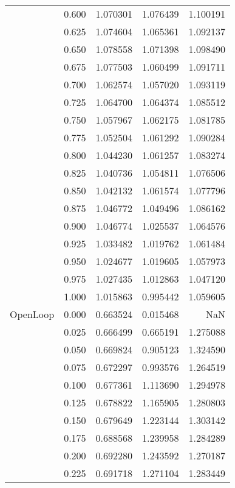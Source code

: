 \begin{tabular}{llrrr}
         & 0.600 &   1.070301 &   1.076439 &   1.100191 \\
         & 0.625 &   1.074604 &   1.065361 &   1.092137 \\
         & 0.650 &   1.078558 &   1.071398 &   1.098490 \\
         & 0.675 &   1.077503 &   1.060499 &   1.091711 \\
         & 0.700 &   1.062574 &   1.057020 &   1.093119 \\
         & 0.725 &   1.064700 &   1.064374 &   1.085512 \\
         & 0.750 &   1.057967 &   1.062175 &   1.081785 \\
         & 0.775 &   1.052504 &   1.061292 &   1.090284 \\
         & 0.800 &   1.044230 &   1.061257 &   1.083274 \\
         & 0.825 &   1.040736 &   1.054811 &   1.076506 \\
         & 0.850 &   1.042132 &   1.061574 &   1.077796 \\
         & 0.875 &   1.046772 &   1.049496 &   1.086162 \\
         & 0.900 &   1.046774 &   1.025537 &   1.064576 \\
         & 0.925 &   1.033482 &   1.019762 &   1.061484 \\
         & 0.950 &   1.024677 &   1.019605 &   1.057973 \\
         & 0.975 &   1.027435 &   1.012863 &   1.047120 \\
         & 1.000 &   1.015863 &   0.995442 &   1.059605 \\
OpenLoop & 0.000 &   0.663524 &   0.015468 &        NaN \\
         & 0.025 &   0.666499 &   0.665191 &   1.275088 \\
         & 0.050 &   0.669824 &   0.905123 &   1.324590 \\
         & 0.075 &   0.672297 &   0.993576 &   1.264519 \\
         & 0.100 &   0.677361 &   1.113690 &   1.294978 \\
         & 0.125 &   0.678822 &   1.165905 &   1.280803 \\
         & 0.150 &   0.679649 &   1.223144 &   1.303142 \\
         & 0.175 &   0.688568 &   1.239958 &   1.284289 \\
         & 0.200 &   0.692280 &   1.243592 &   1.270187 \\
         & 0.225 &   0.691718 &   1.271104 &   1.283449 \\

\end{tabular}
